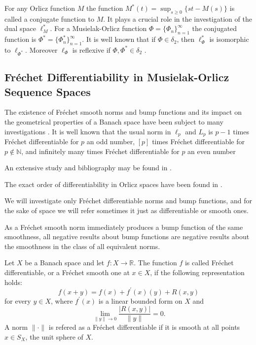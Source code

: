 \documentclass[12pt]{article}
\theoremstyle{thmstyleone}%
\theoremstyle{thmstyletwo}%
\theoremstyle{thmstylethree}%
\begin{document}
{For any Orlicz function $M$ the function $M^{*}(t)=\sup_{s\geq 0}\{st-M(s)\}$ is called a conjugate 
function to $M$. It plays a crucial role in the investigation of the dual space $\ell_M^{*}$. 
For a Musielak-Orlicz function $\Phi=\{\Phi_n\}_{n=1}^\infty$ the conjugated function is
$\Phi^{*}=\{\Phi_n^{*}\}_{n=1}^\infty$. It is well known that if $\Phi\in\delta_2$, then $\ell_{\Phi}^{*}$ is isomorphic to $\ell_{\Phi^{*}}$. Moreover $\ell_{\Phi}$ is reflexive if $\Phi,\Phi^{*}\in\delta_2$ \cite{Kaminska-Lee}. 


\subsection{Fr\'echet Differentiability in Musielak-Orlicz Sequence Spaces}

The existence of Fr\'echet smooth norms and bump
functions and its impact on the geometrical properties of a Banach
space have been subject to many investigations \cite{Deville-Godefroy-Zizler}. 
It is well known that the usual norm in $\ell_p$ and $L_p$ is $p-1$ times Fr\'echet differentiable for $p$ an odd number, $[p]$ times Fr\'echet differentiable for $p\not\in\mathbb{N}$, and infinitely many times Fr\'echet differentiable for $p$ an even number \cite{Bonoc-Frampton,Sundaresan}

An extensive study and bibliography may be found in \cite{Deville-Godefroy-Zizler}.

The exact order of differentiability in Orlicz spaces have been found in \cite{Maleev-Troyanski-91,Maleev-Troyanski-89,Maleev}.

We will investigate only Fr\'echet differentiable norms and bump functions, and for the sake 
of space we will refer sometimes it just as differentiable or smooth ones. 

As a Fr\'echet smooth norm immediately produces a bump function of
the same smoothness, all negative results about bump functions are
negative results about the smoothness in the class of all
equivalent norms.

Let $X$ be a Banach space and let $f:X\to\mathbb{R}$. The function $f$ is called Fr\'echet differentiable, or
a Fr\'echet smooth one at $x\in X$, if the following
representation holds:
$$
f(x+y)=f(x)+f^{\prime}(x)(y)+R(x,y)
$$
for every $y\in X$, where $f^{\prime}(x)$ is a linear bounded
form on $X$ and
$$
\lim_{\|y\|\to 0}\frac{|R(x,y)|}{\|y\|}=0.
$$
A norm $\|\cdot\|$ is refered as a Fr\'echet differentiable if it is 
smooth at all points $x\in S_X$, the unit sphere of $X$.

}
\end{document}
